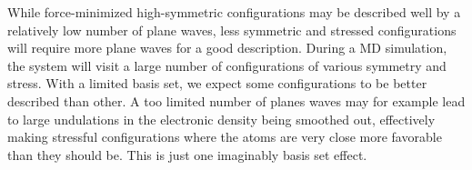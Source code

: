 \documentclass[11pt,bibliography=totoc,index=totoc]{scrbook}   %
\begin{document}



While force-minimized high-symmetric configurations may be described well by a relatively low number of plane waves, 
less symmetric and stressed configurations will require more plane waves for a good description. 
During a MD simulation, the system will visit a large number of configurations of various symmetry and stress. 
With a limited basis set, we expect some configurations to be better described than other. 
A too limited number of planes waves may for example lead to large undulations in the electronic density being smoothed out, 
effectively making stressful configurations where the atoms are very close more favorable than they should be. 
This is just one imaginably basis set effect.
\end{document}
